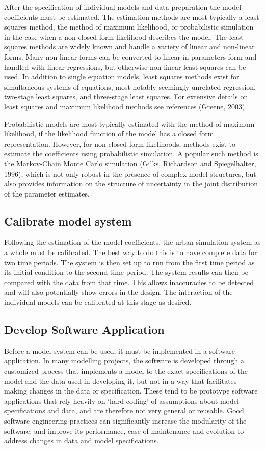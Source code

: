 After the specification of individual models and data preparation the model coefficients must be estimated. The estimation methods are most typically a least squares method, the method of maximum likelihood, or probabilistic simulation in the case when a non-closed form likelihood describes the model.  The least squares methods are widely known and handle a variety of linear and non-linear forms. Many non-linear forms can be converted to linear-in-parameters form and handled with linear regressions, but otherwise non-linear least squares can be used. In addition to single equation models, least squares methods exist for simultaneous systems of equations, most notably seemingly unrelated regression, two-stage least squares, and three-stage least squares. For extensive details on least squares and maximum likelihood methods see references (Greene, 2003).

Probabilistic models are most typically estimated with the method of maximum likelihood, if the likelihood function of the model has a closed form representation. However, for non-closed form likelihoods, methods exist to estimate the coefficients using probabilistic simulation. A popular such method is the Markov-Chain Monte Carlo simulation (Gilks, Richardson and Spiegelhalter, 1996), which is not only robust in the presence of complex model structures, but also provides information on the structure of uncertainty in the joint distribution of the parameter estimates.

\subsection{Calibrate model system}

Following the estimation of the model coefficients, the urban simulation system as a whole must be calibrated. The best way to do this is to have complete data for two time periods. The system is then set up to run from the first time period as its initial condition to the second time period. The system results can then be compared with the data from that time. This allows inaccuracies to be detected and will also potentially show errors in the design. The interaction of the individual models can be calibrated at this stage as desired.

\subsection{Develop Software Application}

Before a model system can be used, it must be implemented in a software application.  In many modelling projects, the software is developed through a customized process that implements a model to the exact specifications of the model and the data used in developing it, but not in a way that facilitates making changes in the data or specification.  These tend to be prototype software applications that rely heavily on `hard-coding' of assumptions about model specifications and data, and are therefore not very general or reusable.  Good software engineering practices can significantly increase the modularity of the software, and improve its performance, ease of maintenance and evolution to address changes in data and model specifications.

